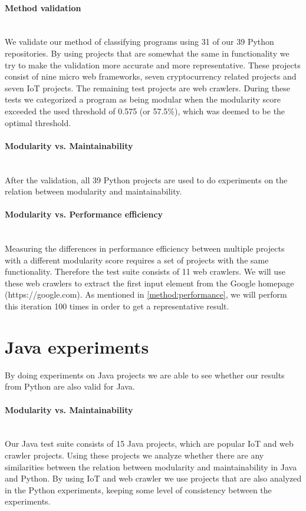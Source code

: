 \documentclass[twoside]{uva-inf-bachelor-thesis}
\newcommand{\myparagraph}[1]{\paragraph{#1}\mbox{}\\}
\begin{document}
\myparagraph{Method validation}
We validate our method of classifying programs using 31 of our 39 Python repositories. By using projects that are somewhat the same in functionality we try to make the validation more accurate and more representative. These projects consist of nine micro web frameworks, seven cryptocurrency related projects and seven IoT projects. The remaining test projects are web crawlers. During these tests we categorized a program as being modular when the modularity score exceeded the used threshold of 0.575 (or 57.5\%), which was deemed to be the optimal threshold.

\myparagraph{Modularity vs. Maintainability}
After the validation, all 39 Python projects are used to do experiments on the relation between modularity and maintainability.

\myparagraph{Modularity vs. Performance efficiency}
Measuring the differences in performance efficiency between multiple projects with a different modularity score requires a set of projects with the same functionality. Therefore the test suite consists of 11 web crawlers. We will use these web crawlers to extract the first input element from the Google homepage (https://google.com). As mentioned in \autoref{method:performance}, we will perform this iteration 100 times in order to get a representative result.

\section{Java experiments}
By doing experiments on Java projects we are able to see whether our results from Python are also valid for Java.

\myparagraph{Modularity vs. Maintainability}
Our Java test suite consists of 15 Java projects, which are popular IoT and web crawler projects. Using these projects we analyze whether there are any similarities between the relation between modularity and maintainability in Java and Python. By using IoT and web crawler we use projects that are also analyzed in the Python experiments, keeping some level of consistency between the experiments.
\end{document}
